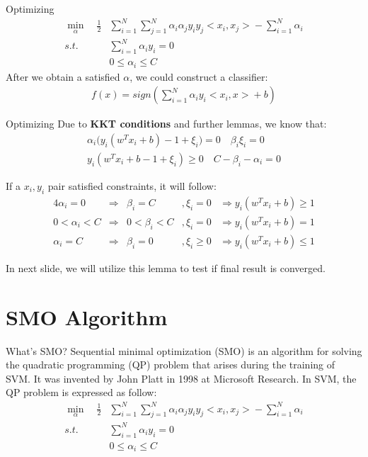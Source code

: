 \documentclass{beamer}
\begin{document}
\begin{frame}{Optimizing}
\begin{align*}
    \min_\alpha \quad \frac{1}{2} &\sum_{i=1}^N \sum_{j=1}^N \alpha_i \alpha_j y_i y_j\bigl< x_i,x_j \bigr> - \sum_{i=1}^N \alpha_i \\
    s.t. \quad & \sum_{i=1}^N \alpha_i y_i = 0 \\
    & 0 \leq \alpha_i \leq C
\end{align*}
After we obtain a satisfied $\alpha$, we could construct a classifier:
\begin{gather*}
    f(x) = sign(\sum_{i=1}^N \alpha_i y_i \bigl< x_i,x \bigr> + b)
\end{gather*}
\end{frame}

\begin{frame}{Optimizing}
Due to \textbf{KKT conditions} and further lemmas, we know that:
\begin{gather*}
    \alpha_i \bigl( y_i (w^T x_i + b) - 1 + \xi_i \bigr) = 0 \quad \beta_i \xi_i = 0 \\
    y_i(w^T x_i + b - 1 + \xi_i) \geq 0 \quad C - \beta_i - \alpha_i = 0
\end{gather*}

If a $x_i, y_i$ pair satisfied constraints, it will follow:
\begin{alignat*}{4}
 \alpha_i = 0 &\Rightarrow& \beta_i = C &, \xi_i=0 &\Rightarrow y_i(w^T x_i + b) \geq 1 \\ 
 0 < \alpha_i < C &\Rightarrow& 0 < \beta_i < C &, \xi_i = 0 &\Rightarrow y_i(w^T x_i + b) = 1 \\  
 \alpha_i = C &\Rightarrow &\beta_i = 0 &, \xi_i \geq 0 &\Rightarrow y_i(w^T x_i + b) \leq 1    
\end{alignat*}

In next slide, we will utilize this lemma to test if final result is converged.
\end{frame}

\section{SMO Algorithm}
\begin{frame}{What's SMO?}
    Sequential minimal optimization (SMO) is an algorithm for solving the quadratic programming (QP) problem that arises during the training of SVM. It was invented by John Platt in 1998 at Microsoft Research. In SVM, the QP problem is expressed as follow:
    \begin{align}
        \min_\alpha \quad \frac{1}{2} &\sum_{i=1}^N \sum_{j=1}^N \alpha_i \alpha_j y_i y_j\bigl< x_i,x_j \bigr> - \sum_{i=1}^N \alpha_i \\
        s.t. \quad & \sum_{i=1}^N \alpha_i y_i = 0 \\
        & 0 \leq \alpha_i \leq C
    \end{align}
\end{frame}
\end{document}
